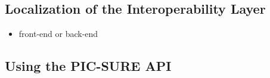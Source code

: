 

\subsection{Localization of the Interoperability Layer}

\begin{itemize}
    \item front-end or back-end
\end{itemize}


\subsection{Using the PIC-SURE API}











